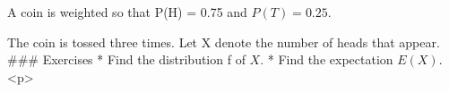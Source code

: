 


 A coin is weighted so that P(H) = 0.75 and $P(T ) = 0.25$.

The coin is tossed three times. Let X denote the number of
heads that appear.
### Exercises 
*   Find the distribution f of $X$.
*  Find the expectation $E(X)$.
<p>
